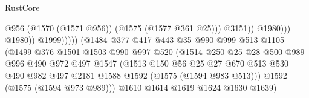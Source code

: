 \begin{lexlean}{RustCore}
\begin{coremodule}
                                                          @956
                                                          (@1570 (@1571 @956))
                                                          (@1575 (@1577 @361 @25)))
                                                        @3151))
                                                    @1980)))
                                              @1980))
                                          @1999)))))
                                (@1484
                                  @377
                                  @417
                                  @443
                                  @35
                                  @990
                                  @999
                                  @513
                                  @1105
                                  (@1499
                                    @376
                                    @1501
                                    @1503
                                    @990
                                    @997
                                    @520
                                    (@1514
                                      @250
                                      @25
                                      @28
                                      @500
                                      @989
                                      @996
                                      @490
                                      @972
                                      @497
                                      @1547
                                      (@1513
                                        @150
                                        @56
                                        @25
                                        @27
                                        @670
                                        @513
                                        @530
                                        @490
                                        @982
                                        @497
                                        @2181
                                        @1588
                                        @1592
                                        (@1575 (@1594 @983 @513)))
                                      @1592
                                      (@1575 (@1594 @973 @989)))
                                    @1610
                                    @1614
                                    @1619
                                    @1624
                                    @1630
                                    @1639)

\end{coremodule}
\end{lexlean}
